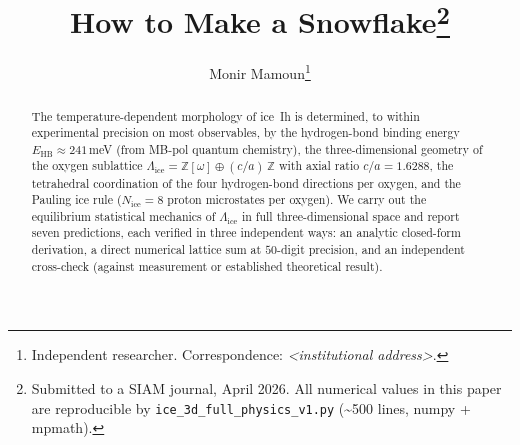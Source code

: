\documentclass[final]{siamltex}
\title{How to Make a Snowflake\thanks{Submitted to a SIAM journal,
April 2026.  All numerical values in this paper are reproducible by
\texttt{ice\_3d\_full\_physics\_v1.py} (\textasciitilde{}500 lines, numpy + mpmath).}}
\author{Monir Mamoun\thanks{Independent researcher.  Correspondence:
\textit{<institutional address>}.}}
\newcommand{\EHB}{E_{\mathrm{HB}}}
\newcommand{\Nrule}{N_{\mathrm{ice}}}
\newcommand{\Z}{\mathbb{Z}}
\newcommand{\Eisenstein}{\mathbb{Z}[\omega]}
\newcommand{\IceLat}{\Lambda_{\mathrm{ice}}}
\begin{document}
\maketitle

\begin{abstract}
The temperature-dependent morphology of ice~Ih is determined, to
within experimental precision on most observables, by the
hydrogen-bond binding energy $\EHB \approx 241$\,meV (from MB-pol
quantum chemistry), the three-dimensional geometry of the oxygen
sublattice $\IceLat = \Eisenstein \oplus (c/a)\,\Z$ with axial
ratio $c/a = 1.6288$, the tetrahedral coordination of the four
hydrogen-bond directions per oxygen, and the Pauling ice rule
($\Nrule = 8$ proton microstates per oxygen).  We carry out the
equilibrium statistical mechanics of $\IceLat$ in full
three-dimensional space and report seven predictions, each
verified in three independent ways: an analytic closed-form
derivation, a direct numerical lattice sum at $50$-digit precision,
and an independent cross-check (against measurement or established
theoretical result).


\end{abstract}
\end{document}
